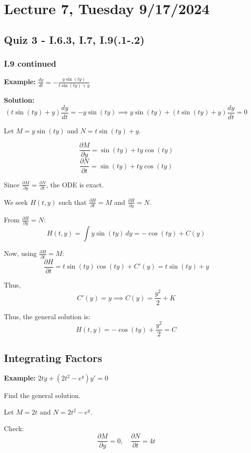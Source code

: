 \documentclass{article}
\begin{document}
\section*{Lecture 7, Tuesday 9/17/2024}


\subsection*{Quiz 3 - I.6.3, I.7, I.9(.1-.2)}

\subsubsection*{I.9 continued}

\textbf{Example:} \(\frac{dy}{dt} = -\frac{y \sin(ty)}{t \sin(ty) + y}\)

\textbf{Solution:} 
\[
(t \sin(ty) + y) \frac{dy}{dt} = -y \sin(ty) \implies y \sin(ty) + (t \sin(ty) + y) \frac{dy}{dt} = 0
\]

Let \( M = y \sin(ty) \) and \( N = t \sin(ty) + y \).

\[
\frac{\partial M}{\partial y} = \sin(ty) + ty \cos(ty)
\]
\[
\frac{\partial N}{\partial t} = \sin(ty) + ty \cos(ty)
\]

Since \(\frac{\partial M}{\partial y} = \frac{\partial N}{\partial t}\), the ODE is exact.

We seek \( H(t, y) \) such that \(\frac{\partial H}{\partial t} = M\) and \(\frac{\partial H}{\partial y} = N\).

From \(\frac{\partial H}{\partial y} = N\):
\[
H(t, y) = \int y \sin(ty) \, dy = -\cos(ty) + C(y)
\]

Now, using \(\frac{\partial H}{\partial t} = M\):
\[
\frac{\partial H}{\partial t} = t \sin(ty) \cos(ty) + C'(y) = t \sin(ty) + y
\]

Thus, 
\[
C'(y) = y \implies C(y) = \frac{y^2}{2} + K
\]

Thus, the general solution is:
\[
H(t, y) = -\cos(ty) + \frac{y^2}{2} = C
\]


\subsection*{Integrating Factors}

\textbf{Example:} \(2ty + (2t^2 - e^y)y' = 0\)

Find the general solution.

Let \( M = 2t \) and \( N = 2t^2 - e^y \).

Check:
\[
\frac{\partial M}{\partial y} = 0, \quad \frac{\partial N}{\partial t} = 4t
\]
\end{document}
